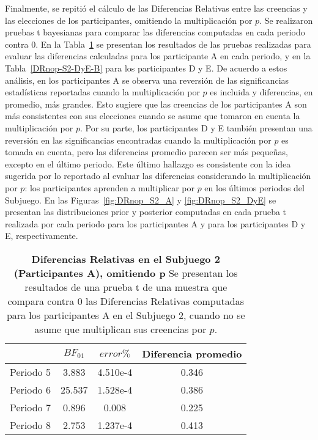 Finalmente, se repitió el cálculo de las Diferencias Relativas entre las creencias y las elecciones de los participantes, omitiendo la multiplicación por $p$. Se realizaron pruebas t bayesianas para comparar las diferencias computadas en cada periodo contra 0. En la Tabla~\ref{DRnop-S2-A-B} se presentan los resultados de las pruebas realizadas para evaluar las diferencias calculadas para los participante A en cada periodo, y en la Tabla~\ref{DRnop-S2-DyE-B} para los participantes D y E. De acuerdo a estos análisis, en los participantes A se observa una reversión de las significancias estadísticas reportadas cuando la multiplicación por $p$ es incluida y diferencias, en promedio, más grandes. Esto sugiere que las creencias de los participantes A son más consistentes con sus elecciones cuando se asume que tomaron en cuenta la multiplicación por $p$. Por su parte, los participantes D y E también presentan una reversión en las significancias encontradas cuando la multiplicación por $p$ es tomada en cuenta, pero las diferencias promedio parecen ser más pequeñas, excepto en el último periodo. Este último hallazgo es consistente con la idea sugerida por lo reportado al evaluar las diferencias considerando la multiplicación por $p$: los participantes aprenden a multiplicar por $p$ en los últimos periodos del Subjuego. En las Figuras~\ref{fig:DRnop_S2_A} y \ref{fig:DRnop_S2_DyE} se presentan las distribuciones prior y posterior computadas en cada prueba t realizada por cada periodo para los participantes A y para los participantes D y E, respectivamente.\\


\begin{table}[h]
\caption[Diferencias Relativas en el Subjuego 2, omitiendo la multiplicación por $p$; Participantes A (Pruebas t de una muestra)]{\textbf{Diferencias Relativas en el Subjuego 2 (Participantes A), omitiendo p} Se presentan los resultados de una prueba t de una muestra que compara contra 0 las Diferencias Relativas computadas para los participantes A en el Subjuego 2, cuando no se asume que multiplican sus creencias por $p$.}
\label{DRnop-S2-A-B}
\centering
\begin{tabular}{l | c c | c}
\toprule
\textbf{} & \textbf{$BF_{01}$} & \textbf{$error\%$} & \textbf{Diferencia promedio}\\
\midrule
Periodo 5 & 3.883 & 4.510e-4 & 0.346\\
Periodo 6 & 25.537 & 1.528e-4 & 0.386\\
Periodo 7 & 0.896 & 0.008 & 0.225\\
Periodo 8 & 2.753 & 1.237e-4 & 0.413\\
\bottomrule
\end{tabular}
\end{table}


